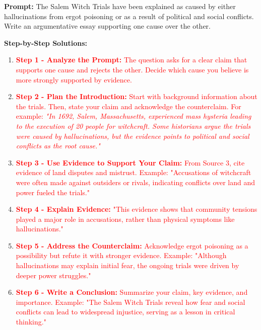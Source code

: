 \documentclass[12pt]{article}
\begin{document}
\vspace{1em}

\begin{tcolorbox}[colframe=black!60, colback=white, 
coltitle=black, colbacktitle=black!15, fonttitle=\bfseries\Large, 
title=Example Test Prompt with Step-by-Step Solutions, halign title=center, left=10pt, right=10pt, top=10pt, bottom=15pt]

\textbf{Prompt:} The Salem Witch Trials have been explained as caused by either hallucinations from ergot poisoning or as a result of political and social conflicts. Write an argumentative essay supporting one cause over the other.

\textbf{Step-by-Step Solutions:}
\begin{enumerate}
    \item \textcolor{red}{\textbf{Step 1 - Analyze the Prompt:} The question asks for a clear claim that supports one cause and rejects the other. Decide which cause you believe is more strongly supported by evidence.}
    \item \textcolor{red}{\textbf{Step 2 - Plan the Introduction:} Start with background information about the trials. Then, state your claim and acknowledge the counterclaim. For example:}  
    \textcolor{red}{\textit{"In 1692, Salem, Massachusetts, experienced mass hysteria leading to the execution of 20 people for witchcraft. Some historians argue the trials were caused by hallucinations, but the evidence points to political and social conflicts as the root cause."}}
    \item \textcolor{red}{\textbf{Step 3 - Use Evidence to Support Your Claim:} From Source 3, cite evidence of land disputes and mistrust. Example: "Accusations of witchcraft were often made against outsiders or rivals, indicating conflicts over land and power fueled the trials."}
    \item \textcolor{red}{\textbf{Step 4 - Explain Evidence:} "This evidence shows that community tensions played a major role in accusations, rather than physical symptoms like hallucinations."}
    \item \textcolor{red}{\textbf{Step 5 - Address the Counterclaim:} Acknowledge ergot poisoning as a possibility but refute it with stronger evidence. Example: "Although hallucinations may explain initial fear, the ongoing trials were driven by deeper power struggles."}
    \item \textcolor{red}{\textbf{Step 6 - Write a Conclusion:} Summarize your claim, key evidence, and importance. Example: "The Salem Witch Trials reveal how fear and social conflicts can lead to widespread injustice, serving as a lesson in critical thinking."}
\end{enumerate}

\end{tcolorbox}
\end{document}
